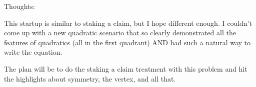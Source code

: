 Thoughts:

This startup is similar to staking a claim, but I hope different enough. I couldn't come up with a new quadratic scenario that so clearly demonstrated all the features of quadratics (all in the first quadrant) AND had such a natural way to write the equation.

The plan will be to do the staking a claim treatment with this problem and hit the highlights about symmetry, the vertex, and all that.


%
%
%
%
%
%
%
%
%
%
%
%
%
%
%
%
%
%
%
%
%
%
%
%
%
%
%
